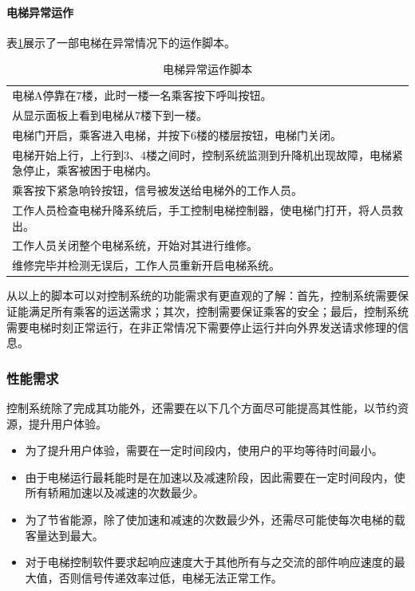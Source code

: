 \paragraph{电梯异常运作}
表\ref{tab:abnormalFunction}展示了一部电梯在异常情况下的运作脚本。

\begin{table}[H]
	\centering
	\caption{电梯异常运作脚本}
	\label{tab:abnormalFunction}
	\begin{tabular}{p{}}
		\toprule
		电梯A停靠在7楼，此时一楼一名乘客按下呼叫按钮。\\ \cmidrule(lr){1-1}
		从显示面板上看到电梯从7楼下到一楼。\\ \cmidrule(lr){1-1}
		电梯门开启，乘客进入电梯，并按下6楼的楼层按钮，电梯门关闭。\\ \cmidrule(lr){1-1}
		电梯开始上行，上行到3、4楼之间时，控制系统监测到升降机出现故障，电梯紧急停止，乘客被困于电梯内。\\ \cmidrule(lr){1-1}
		乘客按下紧急响铃按钮，信号被发送给电梯外的工作人员。\\ \cmidrule(lr){1-1}
		工作人员检查电梯升降系统后，手工控制电梯控制器，使电梯门打开，将人员救出。\\ \cmidrule(lr){1-1}
		工作人员关闭整个电梯系统，开始对其进行维修。\\ \cmidrule(lr){1-1}
		维修完毕并检测无误后，工作人员重新开启电梯系统。\\
		\bottomrule
	\end{tabular}
\end{table} \par
从以上的脚本可以对控制系统的功能需求有更直观的了解：首先，控制系统需要保证能满足所有乘客的运送需求；其次，控制需要保证乘客的安全；最后，控制系统需要电梯时刻正常运行，在非正常情况下需要停止运行并向外界发送请求修理的信息。

\subsubsection{性能需求}
控制系统除了完成其功能外，还需要在以下几个方面尽可能提高其性能，以节约资源，提升用户体验。
\begin{itemize}
	\item 为了提升用户体验，需要在一定时间段内，使用户的平均等待时间最小。
	\item 由于电梯运行最耗能时是在加速以及减速阶段，因此需要在一定时间段内，使所有轿厢加速以及减速的次数最少。
	\item 为了节省能源，除了使加速和减速的次数最少外，还需尽可能使每次电梯的载客量达到最大。
	\item 对于电梯控制软件要求起响应速度大于其他所有与之交流的部件响应速度的最大值，否则信号传递效率过低，电梯无法正常工作。
\end{itemize}

